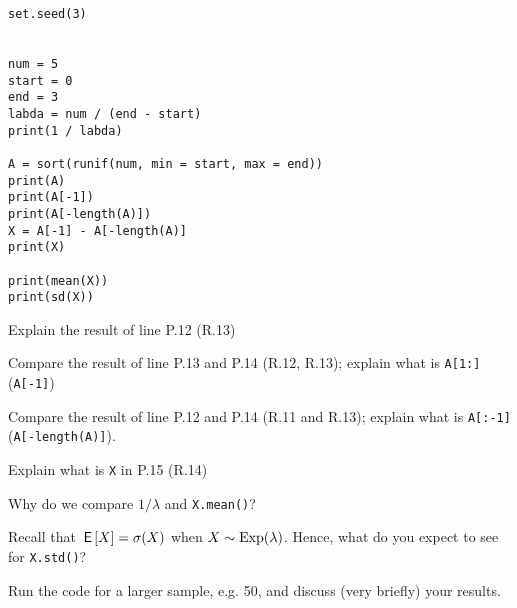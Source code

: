 \documentclass[assignments]{subfiles}
\begin{document}
\begin{verbatim}
set.seed(3)


num = 5
start = 0
end = 3
labda = num / (end - start)
print(1 / labda)

A = sort(runif(num, min = start, max = end))
print(A)
print(A[-1])
print(A[-length(A)])
X = A[-1] - A[-length(A)]
print(X)

print(mean(X))
print(sd(X))
\end{verbatim}

\begin{exercise}
Explain the result of line P.12 (R.13)
\begin{solution}
\end{solution}
\end{exercise}

\begin{exercise}
Compare the result of  line P.13 and P.14 (R.12, R.13);  explain what is \texttt{A[1:]} (\texttt{A[-1]})
\begin{solution}
\end{solution}
\end{exercise}

\begin{exercise}
Compare the result of  line P.12 and P.14 (R.11 and R.13);  explain what is \texttt{A[:-1]} (\texttt{A[-length(A)]}).
\begin{solution}
\end{solution}
\end{exercise}

\begin{exercise}
 Explain what is \texttt{X} in P.15 (R.14)
\begin{solution}
\end{solution}
\end{exercise}

\begin{exercise}
Why do we compare $1/\lambda$ and \texttt{X.mean()}?
\begin{solution}
\end{solution}
\end{exercise}

\begin{exercise}
Recall that $\,\mathsf{E}\left[X\right] = \sigma (X)$ when $X\sim \mathrm{Exp}(\lambda)$.
Hence, what do you expect to see for \texttt{X.std()}?
\begin{solution}
\end{solution}
\end{exercise}

\begin{exercise}
 Run the code for a larger sample, e.g. 50, and discuss (very briefly) your results.
\begin{solution}
\end{solution}
\end{exercise}
\end{document}
